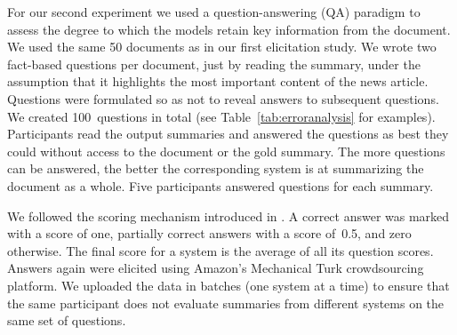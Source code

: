 
%



For our second experiment we used a question-answering (QA) paradigm
\cite{Clarke:Lapata:2010,narayan-rank18} to assess the degree to which
the models retain key information from the document. We used the same
50 documents as in our first elicitation study.  We wrote two
fact-based questions per document, just by reading the summary, under
the assumption that it highlights the most important content of the
news article. Questions were formulated so as not to reveal answers to
subsequent questions.  We created 100~questions in total (see
Table~\ref{tab:erroranalysis} for examples). Participants read the
output summaries and answered the questions as best they could without
access to the document or the gold summary. The more questions can be
answered, the better the corresponding system is at summarizing the
document as a whole.  Five participants answered questions for each
summary.

We followed the scoring mechanism introduced in
. A correct answer was marked with a score
of one, partially correct answers with a score of~0.5, and zero
otherwise. The final score for a system is the average of all its
question scores. Answers again were elicited using Amazon's Mechanical
Turk crowdsourcing platform. We uploaded the data in batches (one
system at a time) to ensure that the same participant does not
evaluate summaries from different systems on the same set of
questions.


